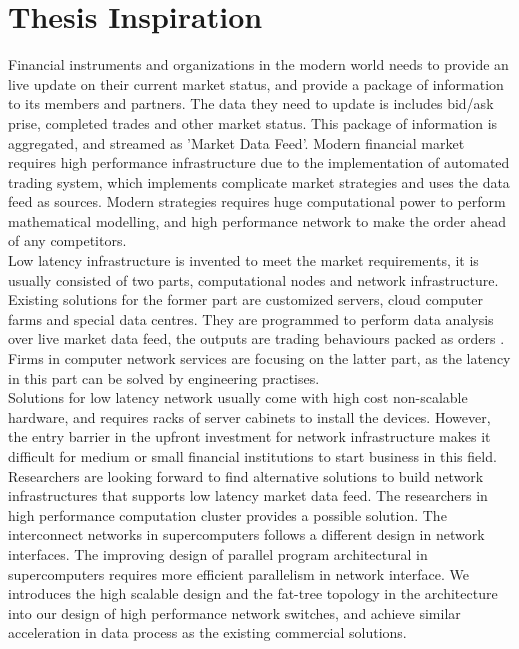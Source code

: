 \documentclass[11pt,openright,a4paper]{report}
\begin{document}
\section{Thesis Inspiration}
Financial instruments and organizations in the modern world needs to provide an live update on their current market status, and provide a package of information to its members and partners. The data they need to update is includes bid/ask prise, completed trades and other market status\cite{alexander2001market}. This package of information is aggregated, and streamed as 'Market Data Feed'. Modern financial market requires high performance infrastructure due to the implementation of automated trading system, which implements complicate market strategies and uses the data feed as sources\cite{le2009automated}. Modern strategies requires huge computational power to perform mathematical modelling, and high performance network to make the order ahead of any competitors.\\
Low latency infrastructure is invented to meet the market requirements, it is usually consisted of two parts,  computational nodes and network infrastructure. Existing solutions for the former part are customized servers, cloud computer farms and special data centres. They are programmed to perform data analysis over live market data feed, the outputs are trading behaviours packed as orders . Firms in computer network services are focusing on the latter part, as the latency in this part can be solved by engineering practises.\\
Solutions for low latency network usually come with high cost non-scalable hardware, and requires racks of server cabinets to install the devices. However, the entry barrier in the upfront investment for network infrastructure makes it difficult for medium or small financial institutions to start business in this field.\\
Researchers are looking forward to find alternative solutions to build network infrastructures that supports low latency market data feed. The researchers in high performance computation cluster provides a possible solution. The interconnect networks in supercomputers follows a different design in network interfaces. The improving design of parallel program architectural in supercomputers requires more efficient parallelism in network interface\cite{pang2014th}. We introduces the high scalable design and the fat-tree topology in the architecture into our design of high performance network switches, and achieve similar acceleration in data process as the existing commercial solutions.\\
\end{document}
